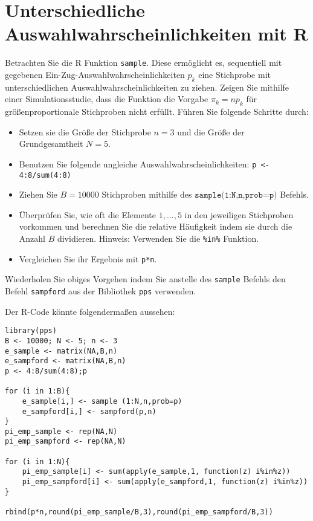 \documentclass{article}
\begin{document}
\section{Unterschiedliche Auswahlwahrscheinlichkeiten mit R}
Betrachten Sie die R Funktion \texttt{sample}. Diese ermöglicht es, sequentiell mit gegebenen Ein-Zug-Auswahlwahrscheinlichkeiten $p_k$ eine Stichprobe mit unterschiedlichen Auswahlwahrscheinlichkeiten zu ziehen. Zeigen Sie mithilfe einer Simulationsstudie, dass die Funktion die Vorgabe $\pi_k = n p_k$ für größenproportionale Stichproben nicht erfüllt. Führen Sie folgende Schritte durch:
\begin{itemize}
	\item Setzen sie die Größe der Stichprobe $n=3$ und die Größe der Grundgesamtheit $N=5$.
	\item Benutzen Sie folgende ungleiche Auswahlwahrscheinlichkeiten: \texttt{p <- 4:8/sum(4:8)}
	\item Ziehen Sie $B=10000$ Stichproben mithilfe des $\texttt{sample(1:N,n,prob=p)}$ Befehls.
	\item Überprüfen Sie, wie oft die Elemente $1,...,5$ in den jeweiligen Stichproben vorkommen und berechnen Sie die relative Häufigkeit indem sie durch die Anzahl $B$ dividieren. Hinweis: Verwenden Sie die \texttt{\%in\%} Funktion.
	\item Vergleichen Sie ihr Ergebnis mit \texttt{p*n}.
\end{itemize}
Wiederholen Sie obiges Vorgehen indem Sie anstelle des \texttt{sample} Befehls den Befehl \texttt{sampford} aus der Bibliothek \texttt{pps} verwenden.
\begin{solution}
Der R-Code könnte folgendermaßen aussehen:
\begin{lstlisting}
library(pps)
B <- 10000; N <- 5; n <- 3
e_sample <- matrix(NA,B,n)
e_sampford <- matrix(NA,B,n)
p <- 4:8/sum(4:8);p

for (i in 1:B){
	e_sample[i,] <- sample (1:N,n,prob=p)
	e_sampford[i,] <- sampford(p,n)
}
pi_emp_sample <- rep(NA,N)
pi_emp_sampford <- rep(NA,N)

for (i in 1:N){
	pi_emp_sample[i] <- sum(apply(e_sample,1, function(z) i%in%z))
	pi_emp_sampford[i] <- sum(apply(e_sampford,1, function(z) i%in%z))
}

rbind(p*n,round(pi_emp_sample/B,3),round(pi_emp_sampford/B,3))
\end{lstlisting}
\end{solution}
\end{document}
